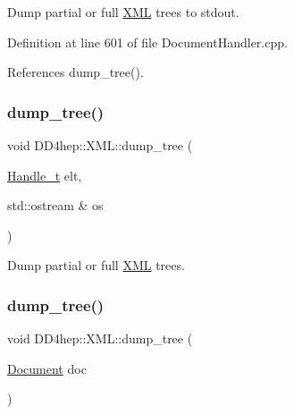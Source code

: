 Dump partial or full \hyperlink{namespace_d_d4hep_1_1_x_m_l}{X\+ML} trees to stdout. 



Definition at line 601 of file Document\+Handler.\+cpp.



References dump\+\_\+tree().

\hypertarget{namespace_d_d4hep_1_1_x_m_l_ad133b21bd1bc50d23e939ac03960341b}{}\label{namespace_d_d4hep_1_1_x_m_l_ad133b21bd1bc50d23e939ac03960341b} 
\subsubsection{\texorpdfstring{dump\+\_\+tree()}{dump\_tree()}\hspace{0.1cm}{\footnotesize\ttfamily [4/6]}}
{\footnotesize\ttfamily void D\+D4hep\+::\+X\+M\+L\+::dump\+\_\+tree (\begin{DoxyParamCaption}\item[{\hyperlink{class_d_d4hep_1_1_x_m_l_1_1_handle__t}{Handle\+\_\+t}}]{elt,  }\item[{std\+::ostream \&}]{os }\end{DoxyParamCaption})}



Dump partial or full \hyperlink{namespace_d_d4hep_1_1_x_m_l}{X\+ML} trees. 

\hypertarget{namespace_d_d4hep_1_1_x_m_l_af7c204b171cd2ffe30308ce5ecdd5d44}{}\label{namespace_d_d4hep_1_1_x_m_l_af7c204b171cd2ffe30308ce5ecdd5d44} 
\subsubsection{\texorpdfstring{dump\+\_\+tree()}{dump\_tree()}\hspace{0.1cm}{\footnotesize\ttfamily [5/6]}}
{\footnotesize\ttfamily void D\+D4hep\+::\+X\+M\+L\+::dump\+\_\+tree (\begin{DoxyParamCaption}\item[{\hyperlink{class_d_d4hep_1_1_x_m_l_1_1_document}{Document}}]{doc }\end{DoxyParamCaption})}



